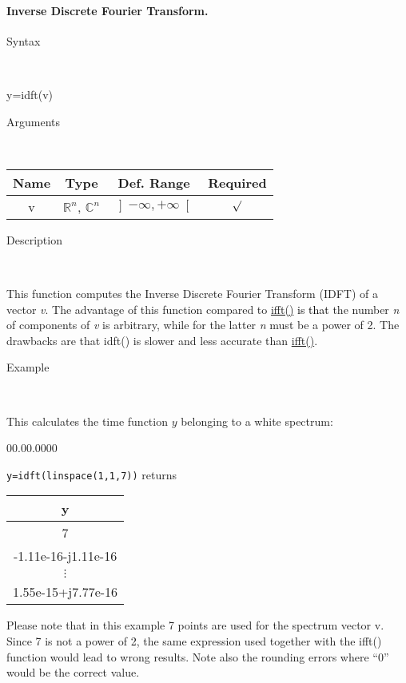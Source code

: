 \paragraph{\label{par:Inverse-Discrete-Fourier}Inverse Discrete Fourier Transform.}

\begin{description}
\item [Syntax]~
\end{description}
y=idft(v)

\begin{description}
\item [Arguments]~
\end{description}
\begin{tabular}{|c|c|c|c|}
\hline 
Name&
Type&
Def. Range&
Required\tabularnewline
\hline
\hline 
v&
$\mathbb{R}^{n}$, $\mathbb{C}^{n}$&
$\left]-\infty,+\infty\right[$&
$\surd$\tabularnewline
\hline 
\end{tabular}

\begin{description}
\item [Description]~
\end{description}
This function computes the Inverse Discrete Fourier Transform (IDFT)
of a vector \textit{v}.  The advantage of this function compared to
\textcolor{blue}{\hyperlink{ifft}{ifft()}}
\textcolor{black}{is that} the number \textit{n} of components of
\textit{v} is arbitrary, while for the latter \textit{n} must be a
power of 2. The drawbacks are that idft() is slower and less accurate
than \textcolor{blue}{\hyperlink{ifft}{ifft()}}.

\begin{description}
\item [Example]~
\end{description}
This calculates the time function $y$ belonging to a white spectrum:

\begin{lyxlist}{00.00.0000}
\item [\texttt{y=idft(linspace(1,1,7))}]returns \begin{tabular}{|c|}
\hline 
y\tabularnewline
\hline
\hline 
7\tabularnewline
\hline 
-1.11e-16-j1.11e-16\tabularnewline
\hline 
$\vdots$\tabularnewline
\hline 
1.55e-15+j7.77e-16\tabularnewline
\hline
\end{tabular}
\end{lyxlist}
Please note that in this example 7 points are used for the spectrum
vector v. Since 7 is not a power of 2, the same expression used
together with the ifft() function would lead to wrong results. Note
also the rounding errors where {}``0'' would be the correct value.

